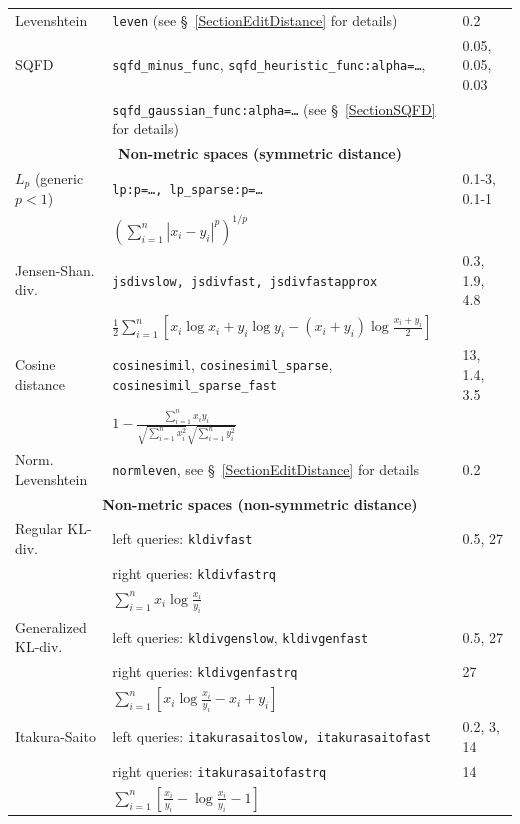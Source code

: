 \documentclass[runningheads,a4paper]{llncs}
\newcommand{\ttt}[1]{\texttt{#1}}
\begin{document}
{\begin{table}
\begin{tabular}{l@{\hspace{2mm}}l@{\hspace{2mm}}l}
\cmidrule(l){1-3} 
Levenshtein       &\ttt{leven} (see \S~\ref{SectionEditDistance} for details) & 0.2 \\
\cmidrule(l){1-3} 
SQFD              & \ttt{sqfd\_minus\_func}, \ttt{sqfd\_heuristic\_func:alpha=\ldots}, & 0.05, 0.05, 0.03 \\
                  &  \ttt{sqfd\_gaussian\_func:alpha=\ldots} (see \S~\ref{SectionSQFD} for details) & \\
\toprule
\multicolumn{3}{c}{\textbf{Non-metric spaces (symmetric distance)}}  \\
\toprule
$L_p$ (generic $p < 1$)& \ttt{lp:p=\ldots, lp\_sparse:p=\ldots}                     &  0.1-3, 0.1-1 \\
                              & $\left(\sum_{i=1}^n |x_i-y_i|^p\right)^{1/p}$  &   \\
\cmidrule(l){1-3} 
Jensen-Shan. div. &\ttt{jsdivslow, jsdivfast, jsdivfastapprox} &   0.3, 1.9, 4.8 \\
                          & $\frac{1}{2}\sum_{i=1}^n \left[x_i \log x_i + y_i \log y_i  - (x_i+y_i)\log \frac{x_i +y_i}{2}\right]$ & \\
\cmidrule(l){1-3} 
Cosine distance & \ttt{cosinesimil}, \ttt{cosinesimil\_sparse}, \ttt{cosinesimil\_sparse\_fast} & { 13, 1.4, 3.5 } \\
                        & $1-\frac{\sum_{i=1}^n x_i y_i}{\sqrt{\sum_{i=1}^n x_i^2}\sqrt{\sum_{i=1}^n y_i^2 }}$   & \vspace{1em} \\
\cmidrule(l){1-3} 
Norm. Levenshtein       &\ttt{normleven}, see \S~\ref{SectionEditDistance} for details & 0.2 \\
\toprule
\multicolumn{3}{c}{\textbf{Non-metric spaces (non-symmetric distance)}}  \\
\toprule
Regular KL-div. & left queries: \ttt{kldivfast}       & 0.5, 27 \\
                       & right queries: \ttt{kldivfastrq}    &  \\
                       & $\sum_{i=1}^n   x_i \log \frac{x_i}{y_i}$  & \\ 
\cmidrule(l){1-3} 
Generalized KL-div. & left queries: \ttt{kldivgenslow}, \ttt{kldivgenfast} & 0.5, 27    \\
                           & right queries: \ttt{kldivgenfastrq} & 27    \\
                           & $\sum_{i=1}^n \left[  x_i \log \frac{x_i}{y_i} -   x_i +   y_i \right]$   &   \\
\cmidrule(l){1-3} 
Itakura-Saito & left queries: \ttt{itakurasaitoslow, itakurasaitofast}   & 0.2, 3, 14 \\
              & right queries: \ttt{itakurasaitofastrq}                  & 14         \\
              & $\sum_{i=1}^n \left[ \frac{ x_i}{y_i} - \log \frac{x_i}{y_i}  -1 \right]$ \\
\toprule
\end{tabular}
\end{table}

}
\end{document}
